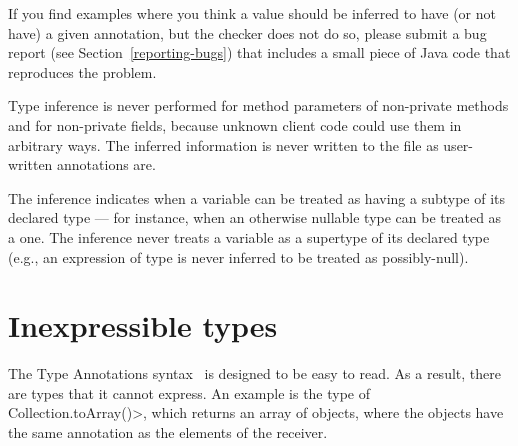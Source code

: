 If you find examples where you think a value should be inferred to have
(or not have) a
given annotation, but the checker does not do so, please submit a bug
report (see Section~\ref{reporting-bugs}) that includes a small piece of
Java code that reproduces the problem.

%
%



Type inference is never performed for method parameters of non-private
methods and for non-private fields, because unknown client code could use
them in arbitrary ways.  The inferred information is never written to the
 file as user-written annotations are.

The inference indicates when a variable can be treated as having a subtype
of its declared type --- for instance, when an otherwise nullable type can be
treated as a  one.  The inference never treats a variable as
a supertype of its declared type (e.g., an expression of 
type is never inferred to be treated as possibly-null).


\section{Inexpressible types\label{inexpressible-types}}

The Type Annotations syntax~\cite{jsr308} is designed to be easy to read.  As a result,
there are types that it cannot express.  An example is the type of
\<Collection.toArray()>, which returns an array of objects, where the
objects have the same annotation as the elements of the receiver.

